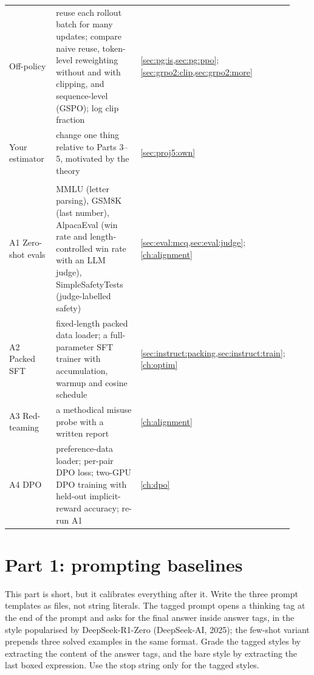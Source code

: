 {\begin{longtable}{@{}>{\raggedright\arraybackslash}p{0.22\linewidth}>{\raggedright\arraybackslash}p{0.44\linewidth}>{\raggedright\arraybackslash}p{0.27\linewidth}@{}}
5 Off-policy & reuse each rollout batch for many updates; compare naive reuse, token-level reweighting without and with clipping, and sequence-level (GSPO); log clip fraction & \cref{sec:pg:is,sec:pg:ppo}; \cref{sec:grpo2:clip,sec:grpo2:more}\\
6 Your estimator & change one thing relative to Parts 3--5, motivated by the theory & \cref{sec:proj5:own}\\
\midrule
\multicolumn{3}{@{}l}{\emph{Alignment track}}\\
A1 Zero-shot evals & MMLU (letter parsing), GSM8K (last number), AlpacaEval (win rate and length-controlled win rate with an LLM judge), SimpleSafetyTests (judge-labelled safety) & \cref{sec:eval:mcq,sec:eval:judge}; \cref{ch:alignment}\\
A2 Packed SFT & fixed-length packed data loader; a full-parameter SFT trainer with accumulation, warmup and cosine schedule & \cref{sec:instruct:packing,sec:instruct:train}; \cref{ch:optim}\\
A3 Red-teaming & a methodical misuse probe with a written report & \cref{ch:alignment}\\
A4 DPO & preference-data loader; per-pair DPO loss; two-GPU DPO training with held-out implicit-reward accuracy; re-run A1 & \cref{ch:dpo}\\
\bottomrule
\end{longtable}}

\section{Part 1: prompting baselines}\label{sec:proj5:prompting}

This part is short, but it calibrates everything after it. Write the three prompt templates as
files, not string literals. The tagged prompt opens a thinking tag at the end of the prompt and
asks for the final answer inside answer tags, in the style popularised by DeepSeek-R1-Zero
(DeepSeek-AI, 2025); the few-shot variant prepends three solved examples in the same format. Grade
the tagged styles by extracting the content of the answer tags, and the bare style by extracting
the last boxed expression. Use the stop string only for the tagged styles.

